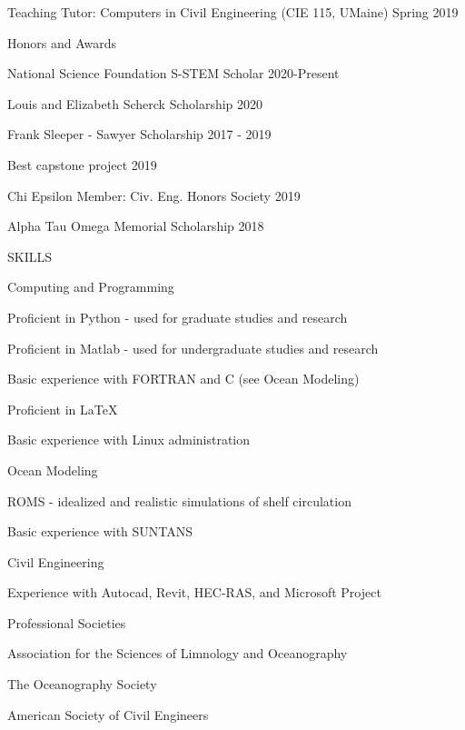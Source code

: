 \documentclass{resume} %
\begin{document}
\begin{rSection}{Teaching}
Tutor: Computers in Civil Engineering (CIE 115, UMaine) \hfill Spring 2019 \\
\end{rSection}
\vspace{-10pt}
\begin{rSection}{Honors and Awards} \itemsep -3pt {}
\vspace{-7pt}
\item National Science Foundation S-STEM Scholar \hfill 2020-Present
\item Louis and Elizabeth Scherck Scholarship \hfill 2020  
\item Frank Sleeper - Sawyer Scholarship \hfill 2017 - 2019
\item Best capstone project \hfill 2019
\item Chi Epsilon Member: Civ. Eng. Honors Society \hfill 2019 
\item Alpha Tau Omega Memorial Scholarship \hfill 2018
\end{rSection}

\begin{rSection}{SKILLS}
\begin{rSubsection}{Computing and Programming}{}{}{} 
\item Proficient in Python - used for graduate studies and research
\item Proficient in Matlab - used for undergraduate studies and research
\item Basic experience with FORTRAN and C (see Ocean Modeling)
\item Proficient in \LaTeX
\item Basic experience with Linux administration
\end{rSubsection}
\begin{rSubsection}{Ocean Modeling}{}{}{} 
\item ROMS - idealized and realistic simulations of shelf circulation
\item Basic experience with SUNTANS
\end{rSubsection}
\begin{rSubsection}{Civil Engineering}{}{}{} 
\item Experience with Autocad, Revit, HEC-RAS, and Microsoft Project
\end{rSubsection}
\end{rSection}

\begin{rSection}{Professional Societies} \itemsep -3pt {}
\vspace{-7pt}
\item Association for the Sciences of Limnology and Oceanography
\item The Oceanography Society 
\item American Society of Civil Engineers
\end{rSection}


\end{document}
